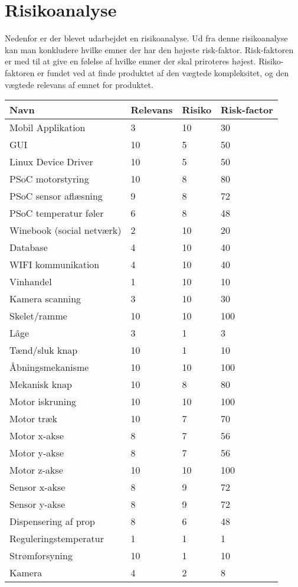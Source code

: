 \section{Risikoanalyse}
Nedenfor er der blevet udarbejdet en risikoanalyse. Ud fra denne risikoanalyse kan man konkludere hvilke emner der har den højeste risk-faktor. Risk-faktoren er med til at give en følelse af hvilke emner der skal priroteres højest. Risiko-faktoren er fundet ved at finde produktet af den vægtede kompleksitet, og den vægtede relevans af emnet for produktet.

\begin{center}
    \begin{tabular}{ | p{5cm} | p{2cm} | p{2cm} | p{2cm}|}
    \hline
    \bfseries {Navn} & \bfseries{Relevans}& \bfseries{Risiko}& \bfseries{Risk-factor}  \\ \hline
    Mobil Applikation & 3 & 10 & 30 \\ \hline
    GUI & 10 & 5 & 50  \\ \hline
    Linux Device Driver& 10& 5 & 50 \\ \hline
	PSoC motorstyring& 10& 8 & 80 \\ \hline
	PSoC sensor aflæsning& 9 & 8 & 72 \\ \hline
	PSoC temperatur føler& 6 & 8 & 48 \\ \hline
	Winebook (social netværk)& 2& 10 & 20 \\ \hline  
	Database& 4& 10 & 40\\ \hline
	WIFI kommunikation& 4& 10 & 40\\ \hline
	Vinhandel& 1 & 10 & 10\\  \hline 
	Kamera scanning& 3 & 10 & 30\\ \hline
	Skelet/ramme & 10 & 10 & 100\\ \hline
	Låge & 3 & 1 & 3\\ \hline
	Tænd/sluk knap & 10 & 1 & 10\\ \hline
	Åbningsmekanisme & 10 & 10 & 100\\ \hline
	Mekanisk knap & 10 & 8 & 80\\ \hline
	Motor iskruning & 10 & 10 & 100\\ \hline
	Motor træk & 10 & 7 & 70\\ \hline
	Motor x-akse & 8 & 7 & 56\\ \hline
	Motor y-akse & 8 & 7 & 56\\ \hline
	Motor z-akse & 10 & 10 & 100\\ \hline
	Sensor x-akse & 8 & 9 & 72\\ \hline
	Sensor y-akse & 8 & 9 & 72\\ \hline
	Dispensering af prop & 8 & 6 & 48\\ \hline
	Reguleringstemperatur & 1 & 1 & 1\\ \hline
	Strømforsyning & 10 & 1 & 10\\ \hline
	Kamera & 4 & 2 & 8\\ \hline
    \end{tabular}
\end{center}